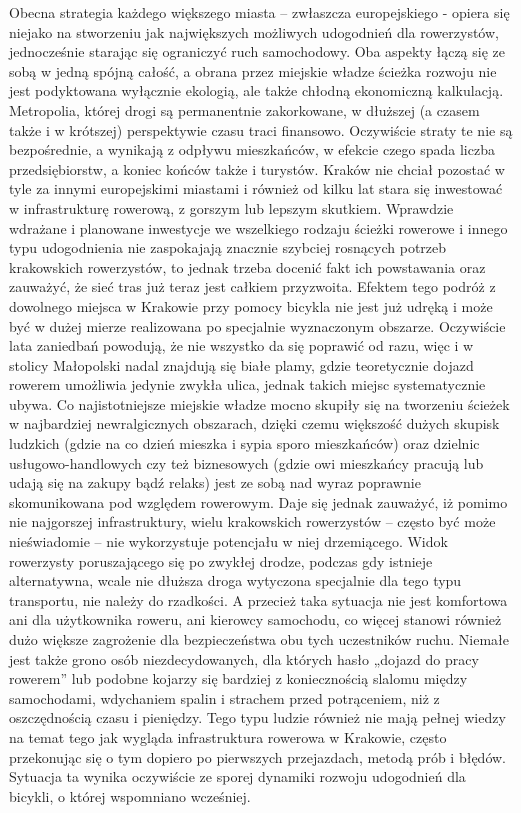 Obecna strategia każdego większego miasta – zwłaszcza europejskiego - opiera się niejako na stworzeniu jak największych możliwych udogodnień dla rowerzystów, jednocześnie starając się ograniczyć ruch samochodowy. Oba aspekty łączą się ze sobą w jedną spójną całość, a obrana przez miejskie władze ścieżka rozwoju nie jest podyktowana wyłącznie ekologią, ale także chłodną ekonomiczną kalkulacją. Metropolia, której drogi są permanentnie zakorkowane, w dłuższej (a czasem także i w krótszej) perspektywie czasu traci finansowo. Oczywiście straty te nie są bezpośrednie, a wynikają z odpływu mieszkańców, w efekcie czego spada liczba przedsiębiorstw, a koniec końców także i turystów.  Kraków nie chciał pozostać w tyle za innymi europejskimi miastami i również od kilku lat stara się inwestować w infrastrukturę rowerową, z gorszym lub lepszym skutkiem. Wprawdzie wdrażane i planowane inwestycje we wszelkiego rodzaju ścieżki rowerowe i innego typu udogodnienia nie zaspokajają znacznie szybciej rosnących potrzeb krakowskich rowerzystów, to jednak trzeba docenić fakt ich powstawania oraz zauważyć, że sieć tras już teraz jest całkiem przyzwoita. Efektem tego podróż z dowolnego miejsca w Krakowie przy pomocy bicykla nie jest już udręką i może być w dużej mierze realizowana po specjalnie wyznaczonym obszarze. Oczywiście lata zaniedbań powodują, że nie wszystko da się poprawić od razu, więc i w stolicy Małopolski nadal znajdują się białe plamy, gdzie teoretycznie dojazd rowerem umożliwia jedynie zwykła ulica, jednak takich miejsc systematycznie ubywa. Co najistotniejsze miejskie władze mocno skupiły się na tworzeniu ścieżek w najbardziej newralgicznych obszarach, dzięki czemu większość dużych skupisk ludzkich (gdzie na co dzień mieszka i sypia sporo mieszkańców) oraz dzielnic usługowo-handlowych czy też biznesowych (gdzie owi mieszkańcy pracują lub udają się na zakupy bądź relaks) jest ze sobą nad wyraz poprawnie skomunikowana pod względem rowerowym. \newline
Daje się jednak zauważyć, iż pomimo nie najgorszej infrastruktury, wielu krakowskich rowerzystów – często być może nieświadomie – nie wykorzystuje potencjału w niej drzemiącego. Widok rowerzysty poruszającego się po zwykłej drodze, podczas gdy istnieje alternatywna, wcale nie dłuższa droga wytyczona specjalnie dla tego typu transportu, nie należy do rzadkości. A przecież taka sytuacja nie jest komfortowa ani dla użytkownika roweru, ani kierowcy samochodu, co więcej stanowi również dużo większe zagrożenie dla bezpieczeństwa obu tych uczestników ruchu. Niemałe jest także grono osób niezdecydowanych, dla których hasło „dojazd do pracy rowerem” lub podobne kojarzy się bardziej z koniecznością slalomu między samochodami, wdychaniem spalin i strachem przed potrąceniem, niż z oszczędnością czasu i pieniędzy. Tego typu ludzie również nie mają pełnej wiedzy na temat tego jak wygląda infrastruktura rowerowa w Krakowie, często przekonując się o tym dopiero po pierwszych przejazdach, metodą prób i błędów. Sytuacja ta wynika oczywiście ze sporej dynamiki rozwoju udogodnień dla bicykli, o której wspomniano wcześniej.
